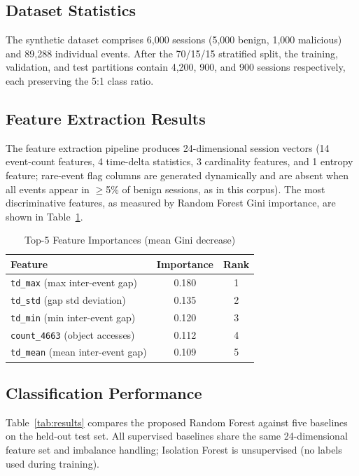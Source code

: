\label{sec:results}

\subsection{Dataset Statistics}

The synthetic dataset comprises 6{,}000 sessions (5{,}000 benign, 1{,}000 malicious)
and 89{,}288 individual events. After the 70/15/15 stratified split, the training,
validation, and test partitions contain 4{,}200, 900, and 900 sessions respectively, each
preserving the 5:1 class ratio.

\subsection{Feature Extraction Results}

The feature extraction pipeline produces 24-dimensional session vectors (14 event-count
features, 4 time-delta statistics, 3 cardinality features, and 1 entropy feature; rare-event
flag columns are generated dynamically and are absent when all events appear in $\geq$5\% of
benign sessions, as in this corpus). The most discriminative features, as measured by Random
Forest Gini importance, are shown in Table~\ref{tab:features}.

\begin{table}[!t]
  \caption{Top-5 Feature Importances (mean Gini decrease)}
  \label{tab:features}
  \centering
  \begin{tabular}{lcc}
    \hline
    Feature & Importance & Rank \\
    \hline
    \texttt{td\_max} (max inter-event gap)  & 0.180 & 1 \\
    \texttt{td\_std} (gap std deviation)    & 0.135 & 2 \\
    \texttt{td\_min} (min inter-event gap)  & 0.120 & 3 \\
    \texttt{count\_4663} (object accesses)  & 0.112 & 4 \\
    \texttt{td\_mean} (mean inter-event gap)& 0.109 & 5 \\
    \hline
  \end{tabular}
\end{table}

\subsection{Classification Performance}

Table~\ref{tab:results} compares the proposed Random Forest against five baselines on the
held-out test set. All supervised baselines share the same 24-dimensional feature set and
imbalance handling; Isolation Forest is unsupervised (no labels used during training).

